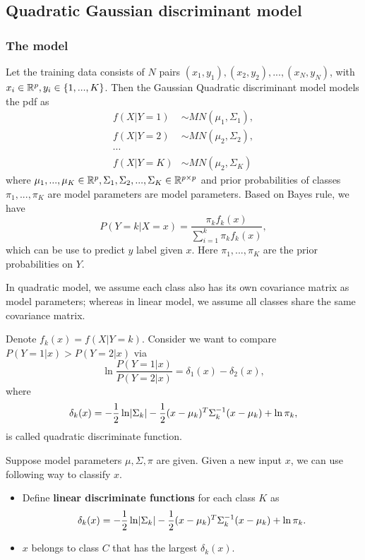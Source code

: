 \begin{refsection}
\subsection{Quadratic Gaussian discriminant model}
\subsubsection{The model}
\begin{definition}\cite[146]{james2013introduction}
	Let the training data consists of $N$ pairs $(x_1,y_1),(x_2,y_2),...,(x_N,y_N)$, with $x_i \in \mathbb{R}^p, y_i \in \{1,...,K\}$. Then the Gaussian Quadratic discriminant model models the pdf as
	\begin{align*}
	f(X|Y=1)&\sim MN(\mu_1,\Sigma_1),\\
	f(X|Y=2)&\sim MN(\mu_2,\Sigma_2),\\
	\cdots&\\
	f(X|Y=K)& \sim MN(\mu_2,\Sigma_K)
	\end{align*}
	where $\mu_1,...,\mu_K\in \mathbb{R}^p, \Sigma_1,\Sigma_2,...,\Sigma_K \in \mathbb{R}^{p\times p}$ and prior probabilities of classes $\pi_1,...,\pi_K$ are model parameters are model parameters.
	Based on Bayes rule, we have
	$$P(Y=k|X=x) = \frac{\pi_k f_k(x)}{\sum_{i=1}^{k}\pi_k f_k(x)},$$
	which can be use to predict $y$ label given $x$. Here $\pi_1,...,\pi_K$ are the prior probabilities on $Y$. 
\end{definition}


\begin{remark}
	In quadratic model, we assume each class also has its own covariance matrix as model parameters; whereas in linear model, we assume all classes share the same covariance matrix. 
\end{remark}


\begin{remark}
	Denote $f_k(x) = f(X|Y=k)$.	
	Consider we want to compare $P(Y=1|x) > P(Y=2|x)$ via
	$$\ln \frac{P(Y=1|x)}{P(Y=2|x)} = \delta_1(x) - \delta_2(x),
	$$
	where $$\delta_k(x) = -\frac{1}{2}\ln \abs{\Sigma_k} - \frac{1}{2}(x-\mu_k)^T\Sigma_k^{-1}(x-\mu_k) + \ln \pi_k,$$ is called quadratic discriminate function.
\end{remark}


\begin{method}
	Suppose model parameters $\mu, \Sigma, \pi$ are given. Given a new input $x$, we can use following way to classify $x$.
	\begin{itemize}
		\item Define \textbf{linear discriminate functions} for each class $K$ as
		$$\delta_k(x) = -\frac{1}{2}\ln \abs{\Sigma_k} - \frac{1}{2}(x-\mu_k)^T\Sigma_k^{-1}(x-\mu_k) + \ln \pi_k.$$
		\item $x$ belongs to class $C$ that has the largest $\delta_k(x)$. 
	\end{itemize}
\end{method}




\end{refsection}

